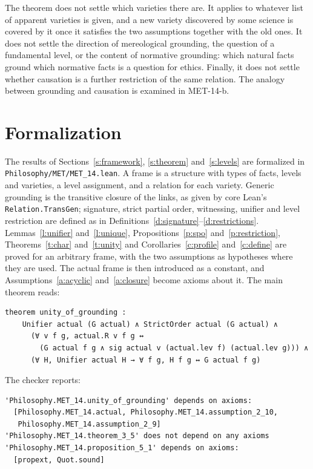 \documentclass{situationist-preprint}
\begin{document}
The theorem does not settle which varieties there are. It applies to whatever list of apparent varieties is given, and a new variety discovered by some science is covered by it once it satisfies the two assumptions together with the old ones. It does not settle the direction of mereological grounding, the question of a fundamental level, or the content of normative grounding: which natural facts ground which normative facts is a question for ethics. Finally, it does not settle whether causation is a further restriction of the same relation. The analogy between grounding and causation is examined in MET-14-b.

\section{Formalization}\label{s:formal}

The results of Sections~\ref{s:framework}, \ref{s:theorem} and~\ref{s:levels} are formalized in \nolinkurl{Philosophy/MET/MET_14.lean}. A frame is a structure with types of facts, levels and varieties, a level assignment, and a relation for each variety. Generic grounding is the transitive closure of the links, as given by core Lean's \texttt{Relation.TransGen}; signature, strict partial order, witnessing, unifier and level restriction are defined as in Definitions~\ref{d:signature}--\ref{d:restrictions}. Lemmas~\ref{l:unifier} and~\ref{l:unique}, Propositions~\ref{p:spo} and~\ref{p:restriction}, Theorems~\ref{t:char} and~\ref{t:unity} and Corollaries~\ref{c:profile} and~\ref{c:define} are proved for an arbitrary frame, with the two assumptions as hypotheses where they are used. The actual frame is then introduced as a constant, and Assumptions~\ref{a:acyclic} and~\ref{a:closure} become axioms about it. The main theorem reads:

\begin{lstlisting}
theorem unity_of_grounding :
    Unifier actual (G actual) ∧ StrictOrder actual (G actual) ∧
      (∀ v f g, actual.R v f g ↔
        (G actual f g ∧ sig actual v (actual.lev f) (actual.lev g))) ∧
      (∀ H, Unifier actual H → ∀ f g, H f g ↔ G actual f g)
\end{lstlisting}

\noindent The checker reports:

\begin{lstlisting}
'Philosophy.MET_14.unity_of_grounding' depends on axioms:
  [Philosophy.MET_14.actual, Philosophy.MET_14.assumption_2_10,
   Philosophy.MET_14.assumption_2_9]
'Philosophy.MET_14.theorem_3_5' does not depend on any axioms
'Philosophy.MET_14.proposition_5_1' depends on axioms:
  [propext, Quot.sound]
\end{lstlisting}
\end{document}
